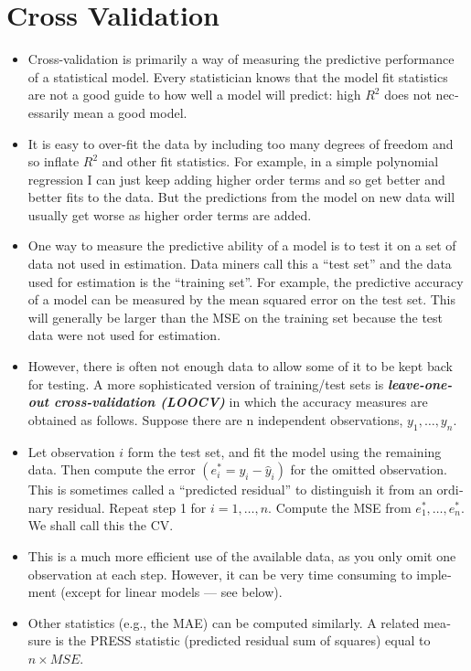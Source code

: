 \documentclass[a4paper,12pt]{article}
\begin{document}
\section*{Cross Validation}
\begin{itemize}
\item
Cross-​​validation is pri­mar­ily a way of mea­sur­ing the pre­dic­tive per­for­mance of a sta­tis­ti­cal model. Every sta­tis­ti­cian knows that the model fit sta­tis­tics are not a good guide to how well a model will pre­dict: high $R^2$ does not nec­es­sar­ily mean a good model. 
\item It is easy to over-​​fit the data by includ­ing too many degrees of free­dom and so inflate $R^2$ and other fit sta­tis­tics. For exam­ple, in a sim­ple poly­no­mial regres­sion I can just keep adding higher order terms and so get bet­ter and bet­ter fits to the data. But the pre­dic­tions from the model on new data will usu­ally get worse as higher order terms are added.
\item
One way to mea­sure the pre­dic­tive abil­ity of a model is to test it on a set of data not used in esti­ma­tion. Data min­ers call this a “test set” and the data used for esti­ma­tion is the “train­ing set”. For exam­ple, the pre­dic­tive accu­racy of a model can be mea­sured by the mean squared error on the test set. This will gen­er­ally be larger than the MSE on the train­ing set because the test data were not used for estimation.
\item
How­ever, there is often not enough data to allow some of it to be kept back for test­ing. A more sophis­ti­cated ver­sion of training/​​test sets is \textit{\textbf{leave-​​one-​​out cross-​​​​validation (LOOCV)}} in which the accu­racy mea­sures are obtained as fol­lows. Sup­pose there are n inde­pen­dent obser­va­tions, $y_1,\dots,y_n$.
\item
Let obser­va­tion $i$ form the test set, and fit the model using the remain­ing data. Then com­pute the error $(e_{i}^*=y_{i}-\hat{y}_{i})$ for the omit­ted obser­va­tion. This is some­times called a “pre­dicted resid­ual” to dis­tin­guish it from an ordi­nary residual.
Repeat step 1 for $i=1,\dots,n$.
Com­pute the MSE from $e_{1}^*,\dots,e_{n}^*$. We shall call this the CV.
\item
This is a much more effi­cient use of the avail­able data, as you only omit one obser­va­tion at each step. How­ever, it can be very time con­sum­ing to imple­ment (except for lin­ear mod­els — see below).
\item 
Other sta­tis­tics (e.g., the MAE) can be com­puted sim­i­larly. A related mea­sure is the PRESS sta­tis­tic (pre­dicted resid­ual sum of squares) equal to $n \times MSE$.
\end{itemize}
\end{document}
